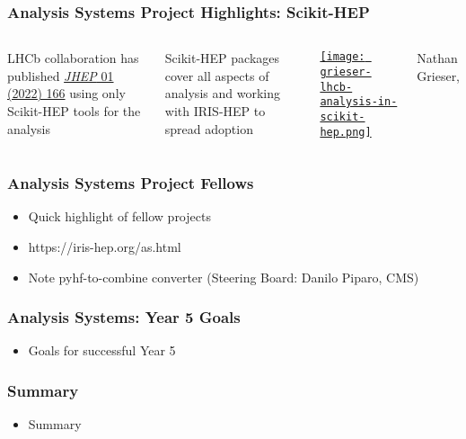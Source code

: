 \begin{frame}
  \frametitle{Analysis Systems Project Highlights: Scikit-HEP}
\vspace{0.25 cm}
\begin{columns}

LHCb collaboration has published \href{https://inspirehep.net/literature/1889335}{\textit{JHEP} 01 (2022) 166} using only Scikit-HEP tools for the analysis

\vspace{0.75 cm}
Scikit-HEP packages cover all aspects of analysis and working with IRIS-HEP to spread adoption

\href{https://indico.cern.ch/event/1126109/contributions/4780169/}{\texttt{[image: grieser-lhcb-analysis-in-scikit-hep.png]}}
\vspace{-5pt}
\begin{center}
  Nathan Grieser, 
\end{center}
\end{columns}
\end{frame}

\begin{frame}
  \frametitle{Analysis Systems Project Fellows}

  \begin{itemize}
    \item Quick highlight of fellow projects
    \item https://iris-hep.org/as.html
    \item Note pyhf-to-combine converter (Steering Board: Danilo Piparo, CMS)
  \end{itemize}

\end{frame}

\begin{frame}
  \frametitle{Analysis Systems: Year 5 Goals}

  \begin{itemize}
    \item Goals for successful Year 5
  \end{itemize}

\end{frame}

\begin{frame}
  \frametitle{Summary}

  \begin{itemize}
    \item Summary
  \end{itemize}

\end{frame}
